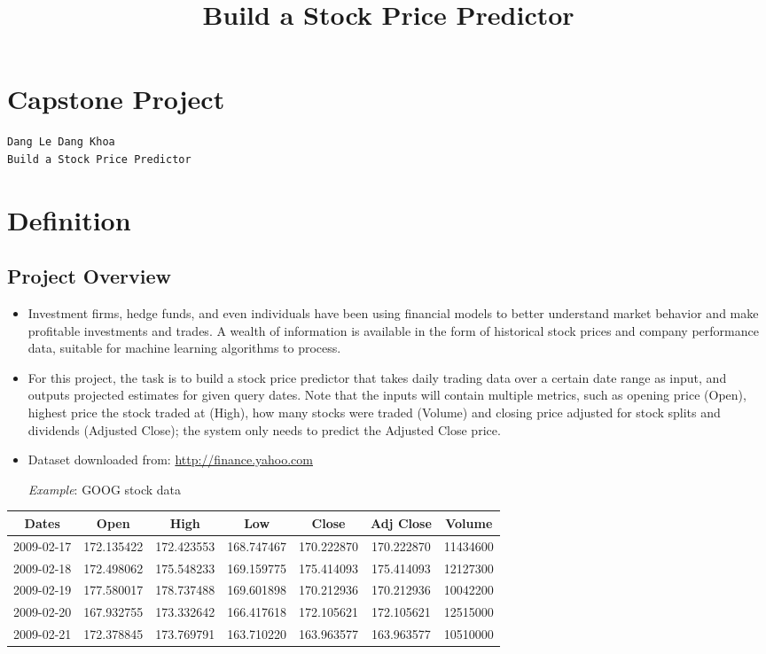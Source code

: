 \documentclass[11pt]{article}
\title{Build a Stock Price Predictor}
\begin{document}
    
    
    \maketitle
    
    

    
    \section{Capstone Project}\label{capstone-project}

\begin{verbatim}
Dang Le Dang Khoa
Build a Stock Price Predictor
\end{verbatim}

\section{Definition}\label{definition}

\subsection{Project Overview}\label{project-overview}

\begin{itemize}
\item
  Investment firms, hedge funds, and even individuals have been using
  financial models to better understand market behavior and make
  profitable investments and trades. A wealth of information is
  available in the form of historical stock prices and company
  performance data, suitable for machine learning algorithms to process.
\item
  For this project, the task is to build a stock price predictor that
  takes daily trading data over a certain date range as input, and
  outputs projected estimates for given query dates. Note that the
  inputs will contain multiple metrics, such as opening price (Open),
  highest price the stock traded at (High), how many stocks were traded
  (Volume) and closing price adjusted for stock splits and dividends
  (Adjusted Close); the system only needs to predict the Adjusted Close
  price.
\item
  Dataset downloaded from: \url{http://finance.yahoo.com}

  \emph{Example}: GOOG stock data
\end{itemize}

\begin{longtable}[]{@{}ccccccc@{}}
\toprule
\textbf{Dates} & \textbf{Open} & \textbf{High} & \textbf{Low} &
\textbf{Close} & \textbf{Adj Close} & \textbf{Volume}\tabularnewline
\midrule
\endhead
2009-02-17 & 172.135422 & 172.423553 & 168.747467 & 170.222870 &
170.222870 & 11434600\tabularnewline
2009-02-18 & 172.498062 & 175.548233 & 169.159775 & 175.414093 &
175.414093 & 12127300\tabularnewline
2009-02-19 & 177.580017 & 178.737488 & 169.601898 & 170.212936 &
170.212936 & 10042200\tabularnewline
2009-02-20 & 167.932755 & 173.332642 & 166.417618 & 172.105621 &
172.105621 & 12515000\tabularnewline
2009-02-21 & 172.378845 & 173.769791 & 163.710220 & 163.963577 &
163.963577 & 10510000\tabularnewline
\bottomrule
\end{longtable}
\end{document}
